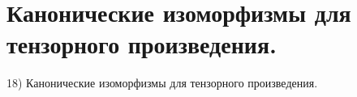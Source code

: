 \section{
 Канонические изоморфизмы для тензорного произведения.
}

18) Канонические изоморфизмы для тензорного произведения.
